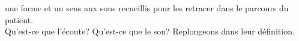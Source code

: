 une forme et un sens aux sons recueillis pour les retracer dans le
parcours du patient.
\\
 Qu'est-ce que l'écoute?  Qu'est-ce que le son?
 Replongeons dans leur définition.



